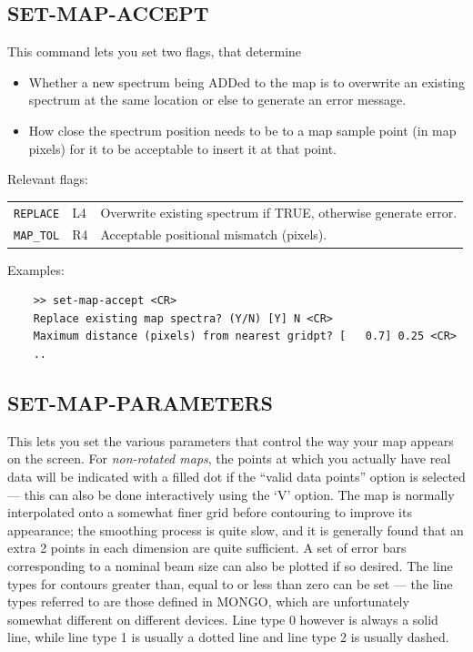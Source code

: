 \documentclass[11pt,twoside]{report}
\begin{document}
\subsection{SET-MAP-ACCEPT} 

This command lets you set two flags, that determine
\begin{itemize}
\item Whether a new spectrum being ADDed to the map is to overwrite an
      existing spectrum at the same location or else to generate an 
      error message.
\item How close the spectrum position needs to be to a map sample point
      (in map pixels) for it to be acceptable to insert it at that point.
\end{itemize}

Relevant flags:\\
\begin{tabular}{lll}
   \verb+REPLACE+  & L4 & Overwrite existing spectrum if TRUE, otherwise
                          generate error.\\
   \verb+MAP_TOL+  & R4 & Acceptable positional mismatch (pixels).
\end{tabular}

Examples:
\begin{verbatim}
    >> set-map-accept <CR>
    Replace existing map spectra? (Y/N) [Y] N <CR>
    Maximum distance (pixels) from nearest gridpt? [   0.7] 0.25 <CR>
    ..
\end{verbatim}

\subsection{SET-MAP-PARAMETERS} 

This lets you set the various parameters that control the way your
map appears on the screen. For {\em non-rotated maps}, the points at
which you actually have real data will be indicated with a filled dot
if the ``valid data points'' option is selected --- this can also be
done interactively using the `V' option. The map is normally interpolated onto
a somewhat finer grid before contouring to improve its appearance;
 the smoothing process is quite slow, and it is generally
found that an extra 2 points in each dimension are quite sufficient. A set of
error bars corresponding to a nominal beam size can also be plotted if so
desired. The line types for contours greater than, equal to or less than zero
can be set --- the line types  referred to are those
defined in MONGO, which are unfortunately somewhat different on different
devices. Line type 0 however is always a solid line, while line type 1 is
usually a dotted line and line type 2 is usually dashed. 
\end{document}
